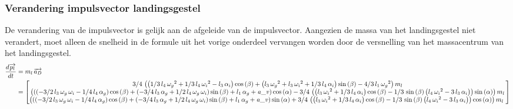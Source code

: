 \subsubsection{Verandering impulsvector landingsgestel}
De verandering van de impulsvector is gelijk aan de afgeleide van de impulsvector. Aangezien de massa van het landingsgestel niet verandert, moet alleen de snelheid in de formule uit het vorige onderdeel vervangen worden door de versnelling van het massacentrum van het landingsgestel.
\begin{equation*}
\begin{split}
\frac{d\overrightarrow{{p}_{l}}}{dt}
&=m_{l}\,\overrightarrow{{a}_{D}}\\
&=	  \begin{bmatrix}
      3/4\, \left(  \left( 1/3\,l_{4}\,{\omega_{g}
}^{2}+1/3\,l_{4}\,{\omega_{i}}^{2}-l_{3}\,\alpha_{i} \right) \cos
 \left( \beta \right) + \left( l_{3}\,{\omega_{g}}^{2}+l_{3}\,{\omega_
{i}}^{2}+1/3\,l_{4}\,\alpha_{i} \right) \sin \left( \beta \right) -4/3
\,l_{1}\,{\omega_{g}}^{2} \right) m_{l}\\ 
%
 \left( 
 \left(  \left( -3/2\,l_{3}\,\omega_{g}\,\omega_{i}-1/4\,l_{4}\,\alpha
_{g} \right) \cos \left( \beta \right) + \left( -3/4\,l_{3}\,\alpha_{g
}+1/2\,l_{4}\,\omega_{g}\,\omega_{i} \right) \sin \left( \beta
 \right) +l_{1}\,\alpha_{g}+{\it a\_v} \right) \cos \left( \alpha
 \right) -3/4\, \left(  \left( l_{3}\,{\omega_{i}}^{2}+1/3\,l_{4}\,
\alpha_{i} \right) \cos \left( \beta \right) -1/3\,\sin \left( \beta
 \right)  \left( l_{4}\,{\omega_{i}}^{2}-3\,l_{3}\,\alpha_{i} \right) 
 \right) \sin \left( \alpha \right)  \right) m_{l}
\\ 
%
 \left(  \left(  \left( -3/2\,l_{3}\,\omega_{g}\,
\omega_{i}-1/4\,l_{4}\,\alpha_{g} \right) \cos \left( \beta \right) +
 \left( -3/4\,l_{3}\,\alpha_{g}+1/2\,l_{4}\,\omega_{g}\,\omega_{i}
 \right) \sin \left( \beta \right) +l_{1}\,\alpha_{g}+{\it a\_v}
 \right) \sin \left( \alpha \right) +3/4\, \left(  \left( l_{3}\,{
\omega_{i}}^{2}+1/3\,l_{4}\,\alpha_{i} \right) \cos \left( \beta
 \right) -1/3\,\sin \left( \beta \right)  \left( l_{4}\,{\omega_{i}}^{
2}-3\,l_{3}\,\alpha_{i} \right)  \right) \cos \left( \alpha \right) 
 \right) m_{l}\
      \end{bmatrix}
\end{split}
\end{equation*}

